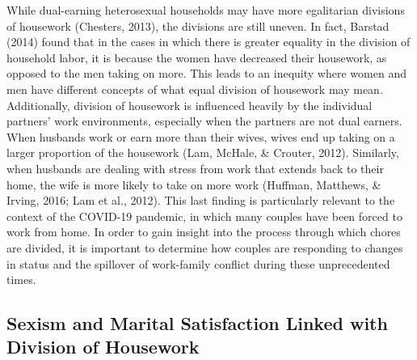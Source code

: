\documentclass[
  man]{apa6}
\begin{document}
While dual-earning heterosexual households may have more egalitarian divisions of housework (Chesters, 2013), the divisions are still uneven. In fact, Barstad (2014) found that in the cases in which there is greater equality in the division of household labor, it is because the women have decreased their housework, as opposed to the men taking on more. This leads to an inequity where women and men have different concepts of what equal division of housework may mean. Additionally, division of housework is influenced heavily by the individual partners' work environments, especially when the partners are not dual earners. When husbands work or earn more than their wives, wives end up taking on a larger proportion of the housework (Lam, McHale, \& Crouter, 2012). Similarly, when husbands are dealing with stress from work that extends back to their home, the wife is more likely to take on more work (Huffman, Matthews, \& Irving, 2016; Lam et al., 2012). This last finding is particularly relevant to the context of the COVID-19 pandemic, in which many couples have been forced to work from home. In order to gain insight into the process through which chores are divided, it is important to determine how couples are responding to changes in status and the spillover of work-family conflict during these unprecedented times.

\hypertarget{sexism-and-marital-satisfaction-linked-with-division-of-housework}{%
\subsection{Sexism and Marital Satisfaction Linked with Division of Housework}\label{sexism-and-marital-satisfaction-linked-with-division-of-housework}}
\end{document}
